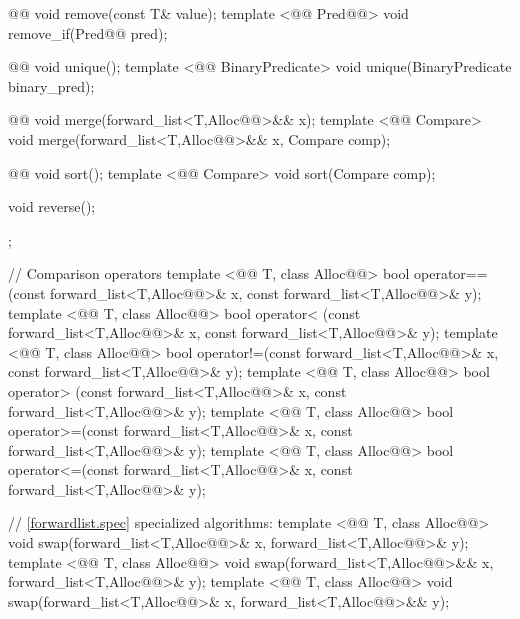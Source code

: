 \documentclass[american,twoside]{book}
\begin{document}
\begin{codeblock}
{{    @@ void remove(const T& value); 
    template <@@ Pred@@> void remove_if(Pred@@ pred); 

    @@ void unique(); 
    template <@@ BinaryPredicate>
      void unique(BinaryPredicate binary_pred); 

    @@ void merge(forward_list<T,Alloc@@>&& x); 
    template <@@ Compare> 
      void merge(forward_list<T,Alloc@@>&& x, Compare comp);

    @@ void sort(); 
    template <@@ Compare> void sort(Compare comp); 

    void reverse(); 
  }; 

  // Comparison operators
  template <@@ T, class Alloc@@> 
    bool operator==(const forward_list<T,Alloc@@>& x, const forward_list<T,Alloc@@>& y); 
  template <@@ T, class Alloc@@> 
    bool operator< (const forward_list<T,Alloc@@>& x, const forward_list<T,Alloc@@>& y); 
  template <@@ T, class Alloc@@> 
    bool operator!=(const forward_list<T,Alloc@@>& x, const forward_list<T,Alloc@@>& y); 
  template <@@ T, class Alloc@@> 
    bool operator> (const forward_list<T,Alloc@@>& x, const forward_list<T,Alloc@@>& y); 
  template <@@ T, class Alloc@@> 
    bool operator>=(const forward_list<T,Alloc@@>& x, const forward_list<T,Alloc@@>& y); 
  template <@@ T, class Alloc@@> 
    bool operator<=(const forward_list<T,Alloc@@>& x, const forward_list<T,Alloc@@>& y); 

  // \ref{forwardlist.spec} specialized algorithms: 
  template <@@ T, class Alloc@@> 
    void swap(forward_list<T,Alloc@@>& x, forward_list<T,Alloc@@>& y);
  template <@@ T, class Alloc@@> 
    void swap(forward_list<T,Alloc@@>&& x, forward_list<T,Alloc@@>& y);
  template <@@ T, class Alloc@@> 
    void swap(forward_list<T,Alloc@@>& x, forward_list<T,Alloc@@>&& y); 
}
\end{codeblock}
\end{document}
